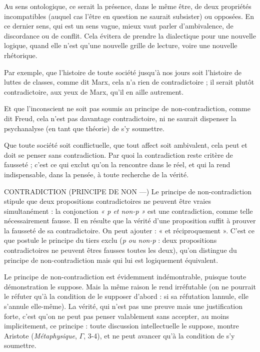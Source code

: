 Au sens ontologique, ce serait la présence, dans le même être, de deux propriétés
incompatibles (auquel cas l'être en question ne saurait subsister) ou
opposées. En ce dernier sens, qui est un sens vague, mieux vaut parler d’ambivalence,
de discordance ou de conflit. Cela évitera de prendre la dialectique
pour une nouvelle logique, quand elle n’est qu’une nouvelle grille de lecture,
voire une nouvelle rhétorique.

Par exemple, que l’histoire de toute société jusqu’à nos jours soit l’histoire
de luttes de classes, comme dit Marx, cela n’a rien de contradictoire ; il serait
plutôt contradictoire, aux yeux de Marx, qu’il en aille autrement.

Et que l'inconscient ne soit pas soumis au principe de non-contradiction,
comme dit Freud, cela n’est pas davantage contradictoire, ni ne saurait dispenser
la psychanalyse (en tant que théorie) de s’y soumettre.

Que toute société soit conflictuelle, que tout affect soit ambivalent, cela
peut et doit se penser sans contradiction. Par quoi la contradiction reste critère
de fausseté ; c’est ce qui exclut qu’on la rencontre dans le réel, et qui la rend
indispensable, dans la pensée, à toute recherche de la vérité.

CONTRADICTION (PRINCIPE DE NON —) Le principe de non-contradiction stipule que
deux propositions contradictoires ne peuvent être vraies simultanément : la conjonction
{\it « p et non-p »} est une contradiction, comme telle nécessairement fausse. Il en
résulte que la vérité d’une proposition suffit à prouver la fausseté de sa contradictoire.
On peut ajouter : « et réciproquement ». C’est ce que postule le principe
du tiers exclu ({\it p ou non-p} : deux propositions contradictoires ne peuvent
êtres fausses toutes les deux), qu’on distingue du principe de non-contradiction
mais qui lui est logiquement équivalent.

Le principe de non-contradiction est évidemment indémontrable, puisque
toute démonstration le suppose. Mais la même raison le rend irréfutable (on ne
pourrait le réfuter qu’à la condition de le supposer d’abord : si sa réfutation
lannule, elle s’annule elle-même). La vérité, qui n’est pas une preuve mais une
justification forte, c’est qu’on ne peut pas penser valablement sans accepter, au
moins implicitement, ce principe : toute discussion intellectuelle le suppose,
montre Aristote ({\it Métaphysique}, $\Gamma$, 3-4), et ne peut avancer qu’à la condition de
s’y soumettre.


